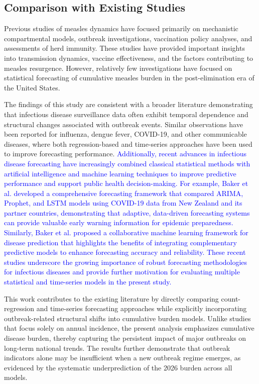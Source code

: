 \documentclass[utf8]{FrontiersinHarvard} %
\begin{document}
\subsection{Comparison with Existing Studies}
Previous studies of measles dynamics have focused primarily on mechanistic compartmental models, outbreak investigations, vaccination policy analyses, and assessments of herd immunity. These studies have provided important insights into transmission dynamics, vaccine effectiveness, and the factors contributing to measles resurgence. However, relatively few investigations have focused on statistical forecasting of cumulative measles burden in the post-elimination era of the United States.

The findings of this study are consistent with a broader literature demonstrating that infectious disease surveillance data often exhibit temporal dependence and structural changes associated with outbreak events. Similar observations have been reported for influenza, dengue fever, COVID-19, and other communicable diseases, where both regression-based and time-series approaches have been used to improve forecasting performance.
\textcolor{blue}{Additionally, recent advances in infectious disease forecasting have increasingly combined classical statistical methods with artificial intelligence and machine learning techniques to improve predictive performance and support public health decision-making. For example, Baker et al. \cite{Baker2025Pandemic} developed a comprehensive forecasting framework that compared ARIMA, Prophet, and LSTM models using COVID-19 data from New Zealand and its partner countries, demonstrating that adaptive, data-driven forecasting systems can provide valuable early warning information for epidemic preparedness.   Similarly, Baker et al. \cite{Baker2025Collaborative} proposed a collaborative machine learning framework for disease prediction that highlights the benefits of integrating complementary predictive models to enhance forecasting accuracy and reliability. These recent studies underscore the growing importance of robust forecasting methodologies for infectious diseases and provide further motivation for evaluating multiple statistical and time-series models in the present study.}

This work contributes to the existing literature by directly comparing count-regression and time-series forecasting approaches while explicitly incorporating outbreak-related structural shifts into cumulative burden models. Unlike studies that focus solely on annual incidence, the present analysis emphasizes cumulative disease burden, thereby capturing the persistent impact of major outbreaks on long-term national trends. The results further demonstrate that outbreak indicators alone may be insufficient when a new outbreak regime emerges, as evidenced by the systematic underprediction of the 2026 burden across all models.
\end{document}
